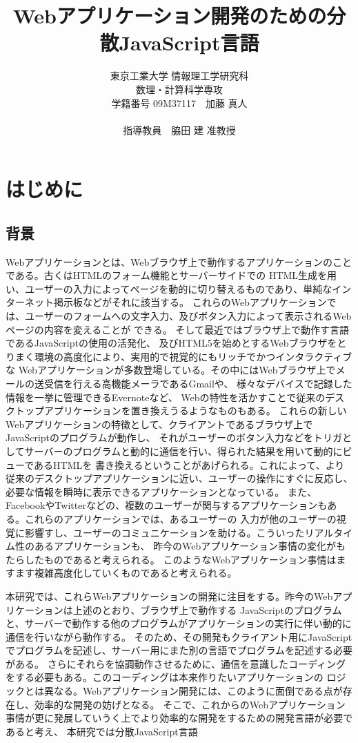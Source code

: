 \documentclass[a4j,12pt]{jreport}
\title {Webアプリケーション開発のための分散JavaScript言語}
\author{東京工業大学 情報理工学研究科 \\数理・計算科学専攻 \\学籍番号 09M37117　加藤 真人\\\\指導教員　脇田 建 准教授}
\begin{document}
\maketitle
\tableofcontents
\listoffigures


\chapter{はじめに}
\section{背景}
Webアプリケーションとは、Webブラウザ上で動作するアプリケーションのことである。古くはHTMLのフォーム機能とサーバーサイドでの
HTML生成を用い、ユーザーの入力によってページを動的に切り替えるものであり、単純なインターネット掲示板などがそれに該当する。
これらのWebアプリケーションでは、ユーザーのフォームへの文字入力、及びボタン入力によって表示されるWebページの内容を変えることが
できる。
そして最近ではブラウザ上で動作す言語であるJavaScriptの使用の活発化、
及びHTML5を始めとするWebブラウザをとりまく環境の高度化により、実用的で視覚的にもリッチでかつインタラクティブな
Webアプリケーションが多数登場している。その中にはWebブラウザ上でメールの送受信を行える高機能メーラであるGmailや、
様々なデバイスで記録した情報を一挙に管理できるEvernoteなど、
Webの特性を活かすことで従来のデスクトップアプリケーションを置き換えうるようなものもある。
これらの新しいWebアプリケーションの特徴として、クライアントであるブラウザ上でJavaScriptのプログラムが動作し、
それがユーザーのボタン入力などをトリガとしてサーバーのプログラムと動的に通信を行い、得られた結果を用いて動的にビューであるHTMLを
書き換えるということがあげられる。これによって、より従来のデスクトップアプリケーションに近い、ユーザーの操作にすぐに反応し、
必要な情報を瞬時に表示できるアプリケーションとなっている。
また、FacebookやTwitterなどの、複数のユーザーが関与するアプリケーションもある。これらのアプリケーションでは、あるユーザーの
入力が他のユーザーの視覚に影響すし、ユーザーのコミュニケーションを助ける。こういったリアルタイム性のあるアプリケーションも、
昨今のWebアプリケーション事情の変化がもたらしたものであると考えられる。
このようなWebアプリケーション事情はますます複雑高度化していくものであると考えられる。

本研究では、これらWebアプリケーションの開発に注目をする。昨今のWebアプリケーションは上述のとおり、ブラウザ上で動作する
JavaScriptのプログラムと、サーバーで動作する他のプログラムがアプリケーションの実行に伴い動的に通信を行いながら動作する。
そのため、その開発もクライアント用にJavaScriptでプログラムを記述し、サーバー用にまた別の言語でプログラムを記述する必要がある。
さらにそれらを協調動作させるために、通信を意識したコーディングをする必要もある。このコーディングは本来作りたいアプリケーションの
ロジックとは異なる。Webアプリケーション開発には、このように面倒である点が存在し、効率的な開発の妨げとなる。
そこで、これからのWebアプリケーション事情が更に発展していうく上でより効率的な開発をするための開発言語が必要であると考え、
本研究では分散JavaScript言語\
\end{document}
